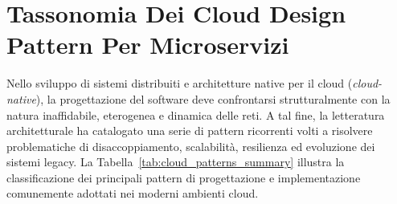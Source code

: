 \documentclass[11pt, a4paper]{article}
\begin{document}
\newpage


\section{Tassonomia Dei Cloud Design Pattern Per Microservizi}

Nello sviluppo di sistemi distribuiti e architetture native per il cloud (\emph{cloud-native}), la progettazione del software deve confrontarsi strutturalmente con la natura inaffidabile, eterogenea e dinamica delle reti. A tal fine, la letteratura architetturale ha catalogato una serie di pattern ricorrenti volti a risolvere problematiche di disaccoppiamento, scalabilità, resilienza ed evoluzione dei sistemi legacy. La Tabella~\ref{tab:cloud_patterns_summary} illustra la classificazione dei principali pattern di progettazione e implementazione comunemente adottati nei moderni ambienti cloud.
\end{document}
